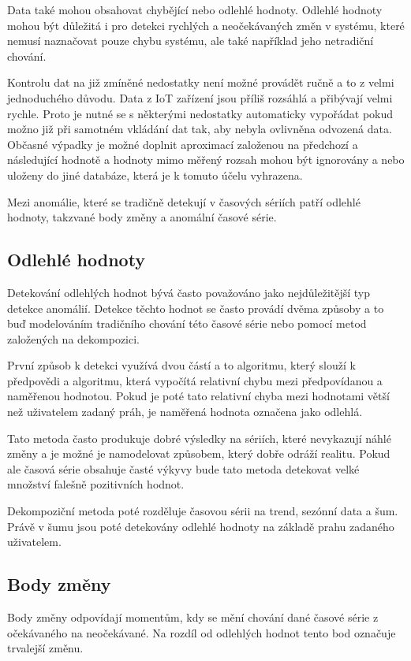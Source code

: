 Data také mohou obsahovat chybějící nebo odlehlé hodnoty. Odlehlé hodnoty mohou být důležitá i pro detekci rychlých a neočekávaných změn v systému, které nemusí naznačovat pouze chybu systému, ale také například jeho netradiční chování.

Kontrolu dat na již zmíněné nedostatky není možné provádět ručně a to z velmi jednoduchého důvodu. Data z IoT zařízení jsou příliš rozsáhlá a přibývají velmi rychle. Proto je nutné se s některými nedostatky automaticky vypořádat pokud možno již při samotném vkládání dat tak, aby nebyla ovlivněna odvozená data. Občasné výpadky je možné doplnit aproximací založenou na předchozí a následující hodnotě a hodnoty mimo měřený rozsah mohou být ignorovány a nebo uloženy do jiné databáze, která je k tomuto účelu vyhrazena.

Mezi anomálie, které se tradičně detekují v časových sériích \cite{laptev2015generic, ren2019time} patří odlehlé hodnoty, takzvané body změny a anomální časové série.
\subsection*{Odlehlé hodnoty}
Detekování odlehlých hodnot bývá často považováno jako nejdůležitější typ detekce anomálií. Detekce těchto hodnot se často provádí dvěma způsoby a to buď modelováním tradičního chování této časové série nebo pomocí metod založených na dekompozici.

První způsob k detekci využívá dvou částí a to algoritmu, který slouží k předpovědi a algoritmu, která vypočítá relativní chybu mezi předpovídanou a naměřenou hodnotou. Pokud je poté tato relativní chyba mezi hodnotami větší než uživatelem zadaný práh, je naměřená hodnota označena jako odlehlá. 

Tato metoda často produkuje dobré výsledky na sériích, které nevykazují náhlé změny a je možné je namodelovat způsobem, který dobře odráží realitu. Pokud ale časová série obsahuje časté výkyvy bude tato metoda detekovat velké množství falešně pozitivních hodnot.

Dekompoziční metoda poté rozděluje časovou sérii na trend, sezónní data a šum. Právě v šumu jsou poté detekovány odlehlé hodnoty na základě prahu zadaného uživatelem.
\subsection*{Body změny}
Body změny odpovídají momentům, kdy se mění chování dané časové série z očekávaného na neočekávané. Na rozdíl od odlehlých hodnot tento bod označuje trvalejší změnu.

